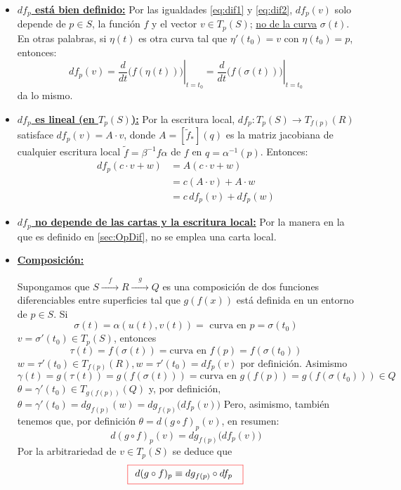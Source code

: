\begin{itemize}
      \item[\textcolor{nblue}{\textbf{(a)}}] \textcolor{nblue}{\textbf{\underline{$df_p$ está bien definido:}}}
      Por las igualdades \eqref{eq:dif1} y \eqref{eq:dif2}, $df_p(v)$ solo depende de $p \in S$, la función $f$ y el vector $v \in T_p(S)$; \underline{no de la curva} $\sigma(t)$. En otras palabras, si $\eta(t)$ es otra curva tal que $\eta'(t_0) = v$ con $\eta(t_0) = p$, entonces:
      \[
      df_p(v) = \left. \frac{d}{dt} \Big( f(\eta(t)) \Big) \right|_{t=t_0} = \left. \frac{d}{dt} \Big( f(\sigma(t)) \Big) \right|_{t=t_0}
      \]
      da lo mismo.
      \item[\textcolor{nblue}{\textbf{(b)}}] \textcolor{nblue}{\textbf{\underline{$df_p$ es lineal (en $T_p(S)$):}}}
      Por la escritura local, $df_p : T_p(S) \longrightarrow T_{f(p)}(R)$ satisface $df_p(v) = A \cdot v$, donde $A = \left[ \tilde{f}_* \right]{(q)}$ es la matriz jacobiana de cualquier escritura local $\tilde{f} = \beta^{-1} f \alpha$ de $f$ en $q = \alpha^{-1}(p)$. Entonces:
      \begin{align*}
      df_p(c \cdot v + w) &= A(c \cdot v + w)\\ 
                          &= c(A \cdot v) + A \cdot w \\
                          &= c \, df_p(v) + df_p(w)
      \end{align*}
      \item[\textcolor{nblue}{\textbf{(c)}}] \textcolor{nblue}{\textbf{\underline{$df_p$ no depende de las cartas y la escritura local:}}}
      Por la manera en la que es definido en \eqref{sec:OpDif}, no se emplea una carta local.
      \item[\textcolor{nblue}{\textbf{(d)}}] \textcolor{nblue}{\textbf{\underline{Composición:}}}
      
      Supongamos que $S \xrightarrow{\quad f \quad} R \xrightarrow{\quad g \quad} Q$ es una composición de dos funciones diferenciables entre superficies tal que $g(f(x))$ está definida en un entorno de $p \in S$. Si 
      $$
      \sigma(t) = \alpha(u(t), v(t)) = \text{ curva en } p = \sigma(t_0)
      $$
      $v = \sigma'(t_0) \in T_p(S)$, entonces
      $$
      \tau(t) = f(\sigma(t)) = \text{curva en } f(p) = f(\sigma(t_0))
      $$
      $w = \tau'(t_0) \in T_{f(p)}(R), w = \tau'(t_0) = df_p(v) \text{ por definición.}$
      Asimismo
      $$
      \gamma(t) = g(\tau(t)) = g(f(\sigma(t))) = \text{curva en } g(f(p)) = g(f(\sigma(t_0))) \in Q
      $$
      $\theta = \gamma'(t_0) \in T_{g(f(p))}(Q)$ y, por definición, $\theta = \gamma'(t_0) = dg_{f(p)}(w) = dg_{f(p)}\big(df_p(v)\big)$
      Pero, asimismo, también tenemos que, por definición $\theta = d(g \circ f)_p(v)$, en resumen:
      \[
      d(g \circ f)_p(v) = dg_{f(p)}\big(df_p(v)\big)
      \]
      Por la arbitrariedad de $v \in T_p(S)$ se deduce que
      \begin{equation*}
      \boxedred{d(g \circ f)_p \equiv dg_{f(p)} \circ df_p}
      \end{equation*}
   \end{itemize}

